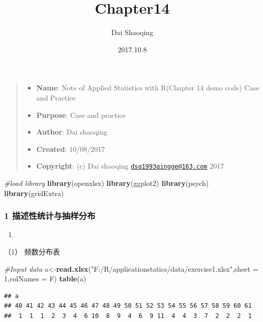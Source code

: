 \documentclass[]{article}
\title{Chapter14}
\author{Dai Shaoqing}
\date{2017.10.8}
\newenvironment{Shaded}{\begin{snugshade}}{\end{snugshade}}
\newcommand{\KeywordTok}[1]{\textcolor[rgb]{0.13,0.29,0.53}{\textbf{#1}}}
\newcommand{\DataTypeTok}[1]{\textcolor[rgb]{0.13,0.29,0.53}{#1}}
\newcommand{\DecValTok}[1]{\textcolor[rgb]{0.00,0.00,0.81}{#1}}
\newcommand{\StringTok}[1]{\textcolor[rgb]{0.31,0.60,0.02}{#1}}
\newcommand{\CommentTok}[1]{\textcolor[rgb]{0.56,0.35,0.01}{\textit{#1}}}
\newcommand{\NormalTok}[1]{#1}
\providecommand{\tightlist}{%
  \setlength{\itemsep}{0pt}\setlength{\parskip}{0pt}}
\begin{document}
\maketitle

\begin{quote}
\begin{itemize}
\tightlist
\item
  \textbf{Name}: Note of Applied Statistics with R(Chapter 14 demo code)
  Case and Practice
\item
  \textbf{Purpose}: Case and practice
\item
  \textbf{Author}: Dai shaoqing
\item
  \textbf{Created}: 10/08/2017
\item
  \textbf{Copyright}: (c) Dai shaoqing
  \href{mailto:dsq1993qingge@163.com}{\nolinkurl{dsq1993qingge@163.com}}
  2017
\end{itemize}
\end{quote}

\begin{Shaded}
\begin{Highlighting}[]
\CommentTok{#load library}
\KeywordTok{library}\NormalTok{(openxlsx)}
\KeywordTok{library}\NormalTok{(ggplot2)}
\KeywordTok{library}\NormalTok{(psych)}
\KeywordTok{library}\NormalTok{(gridExtra)}
\end{Highlighting}
\end{Shaded}

\subsubsection{1 描述性统计与抽样分布}

\begin{enumerate}
\def\labelenumi{\arabic{enumi}.}
\item
\end{enumerate}

（1） 频数分布表

\begin{Shaded}
\begin{Highlighting}[]
\CommentTok{#Input data}
\NormalTok{a<-}\KeywordTok{read.xlsx}\NormalTok{(}\StringTok{"F:/R/applicationstatics/data/exercise1.xlsx"}\NormalTok{,}\DataTypeTok{sheet =} \DecValTok{1}\NormalTok{,}\DataTypeTok{colNames =}\NormalTok{ F)}
\KeywordTok{table}\NormalTok{(a)}
\end{Highlighting}
\end{Shaded}

\begin{verbatim}
## a
## 40 41 42 43 44 45 46 47 48 49 50 51 52 53 54 55 56 57 58 59 60 61 
##  1  1  1  2  3  4  6 10  8  9  4  6  9 11  4  4  3  7  2  2  2  1
\end{verbatim}
\end{document}
